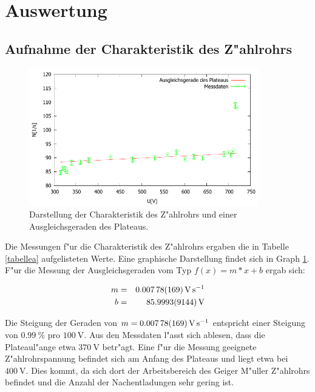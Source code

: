 \section{Auswertung}
	\label{sec:auswertung}

	\subsection{Aufnahme der Charakteristik des Z"ahlrohrs} %
	\label{sub:z_ahlrohr_charakteristik}

	

	\begin{figure}[!h]
		\centering
		\includegraphics[width = 10cm]{img/charakteristik.pdf}
		\caption{Darstellung der Charakteristik des Z"ahlrohrs und einer Ausgleichsgeraden des Plateaus.}
		\label{charakteristik}
	\end{figure}

	Die Messungen f"ur die Charakteristik des Z"ahlrohrs ergaben die in Tabelle \ref{tabellea} aufgelisteten Werte. Eine graphische Darstellung findet sich in Graph \ref{charakteristik}.
	F"ur die Messung der Ausgleichsgeraden vom Typ $f(x) = m*x+b$ ergab sich:

	\begin{eqnarray*}
		m &=& \SI{0.00778 (169)}{\volt\per\second}\\
		b &=& \SI{85.9993 (9144)}{\volt}
	\end{eqnarray*}

	Die Steigung der Geraden von $m = \SI{0.00778 (169)}{\volt\per\second}$ entspricht einer Steigung von $\SI{0.99}{\%}$ pro $\SI{100}{\volt}$.
	Aus den Messdaten l"asst sich ablesen, dass die Plateaul"ange etwa $\SI{370}{\volt}$ betr"agt.
	Eine f"ur die Messung geeignete Z"ahlrohrspannung befindet sich am Anfang des Plateaus und liegt etwa bei $\SI{400}{\volt}$. Dies kommt, da sich dort der Arbeitsbereich des Geiger M"uller Z"ahlrohrs befindet und die Anzahl der Nachentladungen sehr gering ist.

